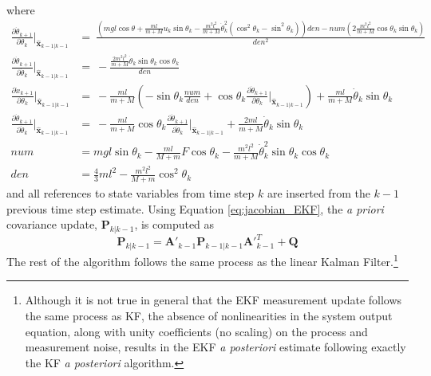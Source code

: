 \documentclass{article}
\newcommand{\matr}[1]{\bm{#1}}     %
\begin{document}
where
\begin{align*}
\frac{\partial \dot{\theta}_{k+1}}{\partial \theta_k}\Big|_{\hat{\matr{x}}_{k-1|k-1}} &= \
\frac{(mgl\cos\theta + \frac{ml}{m+M}u_k\sin\theta_k - \frac{m^2l^2}{m+M}\dot{\theta}_k^2(\cos^2\theta_k-\sin^2\theta_k))den - num(2\frac{m^2l^2}{m+M}\cos\theta_k\sin\theta_k)}{den^2} \\
\frac{\partial \dot{\theta}_{k+1}}{\partial \dot{\theta}_k}\Big|_{\hat{\matr{x}}_{k-1|k-1}} &=\
-\frac{\frac{2m^2l^2}{m+M}\dot{\theta}_k\sin\theta_k\cos\theta_k}{den} \\
\frac{\partial \dot{x}_{k+1}}{\partial \theta_k}\Big|_{\hat{\matr{x}}_{k-1|k-1}} &=\
-\frac{ml}{m+M}(-\sin\theta_k \frac{num}{den} + \cos\theta_k\frac{\partial \dot{\theta}_{k+1}}{\partial \theta_k}\Big|_{\hat{\matr{x}}_{k-1|k-1}}) + \frac{ml}{m+M}\dot{\theta}_k\sin\theta_k \\
\frac{\partial \dot{\theta}_{k+1}}{\partial \dot{\theta}_k}\Big|_{\hat{\matr{x}}_{k-1|k-1}} &=\
-\frac{ml}{m+M}\cos\theta_k\frac{\partial \dot{\theta}_{k+1}}{\partial \dot{\theta}_k}\Big|_{\hat{\matr{x}}_{k-1|k-1}} + \frac{2ml}{m+M}\dot{\theta}_k\sin\theta_k \\
num &= mgl\sin\theta_k - \frac{ml}{M+m} F\cos\theta_k -\frac{m^2l^2}{m+M}\dot{\theta}_k^2\sin\theta_k\cos\theta_k \\
den &= \frac{4}{3}ml^2-\frac{m^2l^2}{M+m}\cos^2 \theta_k
\end{align*}
and all references to state variables from time step $k$ are inserted from the $k-1$ previous time step estimate.
Using Equation \ref{eq:jacobian_EKF}, the \textit{a priori} covariance update, $\matr{P}_{k|k-1}$, is computed as
\begin{equation}
\matr{P}_{k|k-1} = \matr{A}'_{k-1} \matr{P}_{k-1|k-1} {\matr{A}'}_{k-1}^T + \matr{Q}
\end{equation}
The rest of the algorithm follows the same process as the linear Kalman Filter.\footnote{Although it is not true in general that the EKF measurement update follows the same process as KF, the absence of nonlinearities in the system output equation, along with unity coefficients (no scaling) on the process and measurement noise, results in the EKF \textit{a posteriori} estimate following exactly the KF \textit{a posteriori} algorithm.}
\end{document}

